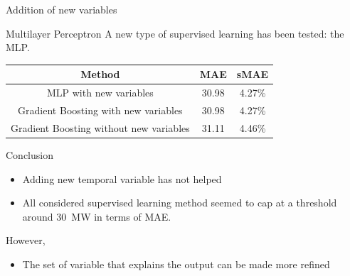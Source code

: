\documentclass[12pt]{beamer}
\begin{document}
\begin{frame}{Addition of new variables}
    \begin{center}
    \end{center}
    \footnotetext[1]{\SI{}{\mega \watt}}
\end{frame}

\begin{frame}{Multilayer Perceptron}
    A new type of supervised learning has been tested: the MLP.
    \begin{center}
        \begin{tabular}{|c|c|c|}
            \hline 
            Method & MAE\footnotemark[1] & sMAE\footnotemark[1] \\ \hline
            \alert{MLP with new variables} & 30.98 & 4.27\%  \\ \hline
            Gradient Boosting with new variables & 30.98 & 4.27\% \\ \hline
            Gradient Boosting without new variables & 31.11 & 4.46\% \\ \hline
        \end{tabular}
    \end{center}
    \footnotetext[1]{\SI{}{\mega \watt}}
\end{frame}

\begin{frame}{Conclusion}
    \begin{itemize}
        \item Adding new temporal variable has not helped
        \item All considered supervised learning method seemed to cap at a threshold around \SI{30}{\mega \watt} in terms of MAE.
    \end{itemize}
    However,
    \begin{itemize}
        \item The set of variable that explains the output can be made more refined
    \end{itemize}
\end{frame}
\end{document}
